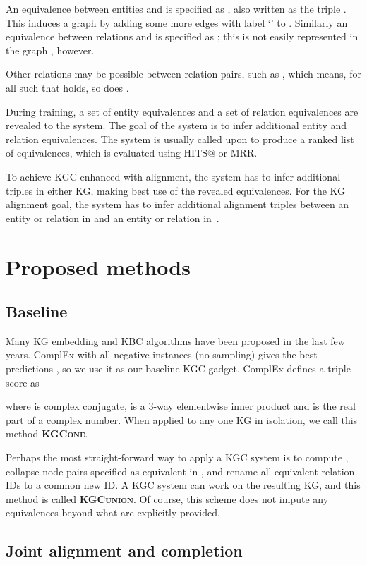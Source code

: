 \documentclass[11pt]{article}
\def\KbcOne{\textsc{KGC\-one}}
\def\KbcUnion{\textsc{KGC\-union}}
\begin{document}
An equivalence between entities  and  is specified as , also written as the triple .
This induces a graph by adding some more edges with label `' to .
Similarly an equivalence between relations  and  is specified as ; this is not easily represented in the graph , however.

Other relations may be possible between relation pairs, such as , which means, for all  such that  holds, so does .

During training, a set of entity equivalences
 and a set of relation equivalences  are revealed to the system.  The goal of the system is to infer additional entity and relation equivalences.  The system is usually called upon to produce a ranked list of equivalences, which is evaluated using HITS@ or MRR.

To achieve KGC enhanced with alignment, the system has to infer additional triples in either KG, making best use of the revealed equivalences.  For the KG alignment goal, the system has to infer additional alignment triples between an entity or relation in  and an entity or relation in~.


\section{Proposed methods}
\label{sec:Method}

\subsection{Baseline}

Many KG embedding and KBC algorithms have been proposed in the last few years.  ComplEx \citep{trouillon2016complex} with all negative instances (no sampling) gives the best predictions \citep{jain-baseline}, so we use it as our baseline KGC gadget.  ComplEx defines a triple score as 
  
where  is complex conjugate,  is a 3-way elementwise inner product and  is the real part of a complex number.   When applied to any one KG in isolation, we call this method \textbf{\KbcOne{}}.

Perhaps the most straight-forward way to apply a KGC system is to compute , collapse node pairs specified as equivalent in , and rename all equivalent  relation IDs to a common new ID. A KGC system can work on the resulting KG, and this method is called \textbf{\KbcUnion{}}.  Of course, this scheme does not impute any equivalences beyond what are explicitly provided.

\subsection{Joint alignment and completion}
\end{document}
